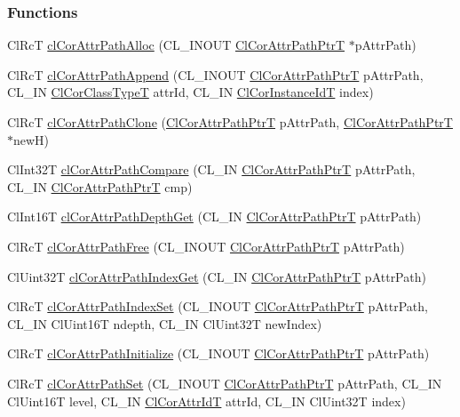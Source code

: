 \subsubsection*{Functions}
\begin{CompactItemize}
\item 
Cl\-Rc\-T \hyperlink{group__group13_ga130}{cl\-Cor\-Attr\-Path\-Alloc} (CL\_\-INOUT \hyperlink{struct_cl_cor_attr_path}{Cl\-Cor\-Attr\-Path\-Ptr\-T} $\ast$p\-Attr\-Path)
\item 
Cl\-Rc\-T \hyperlink{group__group13_ga135}{cl\-Cor\-Attr\-Path\-Append} (CL\_\-INOUT \hyperlink{struct_cl_cor_attr_path}{Cl\-Cor\-Attr\-Path\-Ptr\-T} p\-Attr\-Path, CL\_\-IN \hyperlink{group__group13_ga2}{Cl\-Cor\-Class\-Type\-T} attr\-Id, CL\_\-IN \hyperlink{group__group13_ga4}{Cl\-Cor\-Instance\-Id\-T} index)
\item 
Cl\-Rc\-T \hyperlink{group__group13_ga142}{cl\-Cor\-Attr\-Path\-Clone} (\hyperlink{struct_cl_cor_attr_path}{Cl\-Cor\-Attr\-Path\-Ptr\-T} p\-Attr\-Path, \hyperlink{struct_cl_cor_attr_path}{Cl\-Cor\-Attr\-Path\-Ptr\-T} $\ast$new\-H)
\item 
Cl\-Int32T \hyperlink{group__group13_ga141}{cl\-Cor\-Attr\-Path\-Compare} (CL\_\-IN \hyperlink{struct_cl_cor_attr_path}{Cl\-Cor\-Attr\-Path\-Ptr\-T} p\-Attr\-Path, CL\_\-IN \hyperlink{struct_cl_cor_attr_path}{Cl\-Cor\-Attr\-Path\-Ptr\-T} cmp)
\item 
Cl\-Int16T \hyperlink{group__group13_ga136}{cl\-Cor\-Attr\-Path\-Depth\-Get} (CL\_\-IN \hyperlink{struct_cl_cor_attr_path}{Cl\-Cor\-Attr\-Path\-Ptr\-T} p\-Attr\-Path)
\item 
Cl\-Rc\-T \hyperlink{group__group13_ga132}{cl\-Cor\-Attr\-Path\-Free} (CL\_\-INOUT \hyperlink{struct_cl_cor_attr_path}{Cl\-Cor\-Attr\-Path\-Ptr\-T} p\-Attr\-Path)
\item 
Cl\-Uint32T \hyperlink{group__group13_ga139}{cl\-Cor\-Attr\-Path\-Index\-Get} (CL\_\-IN \hyperlink{struct_cl_cor_attr_path}{Cl\-Cor\-Attr\-Path\-Ptr\-T} p\-Attr\-Path)
\item 
Cl\-Rc\-T \hyperlink{group__group13_ga140}{cl\-Cor\-Attr\-Path\-Index\-Set} (CL\_\-INOUT \hyperlink{struct_cl_cor_attr_path}{Cl\-Cor\-Attr\-Path\-Ptr\-T} p\-Attr\-Path, CL\_\-IN Cl\-Uint16T ndepth, CL\_\-IN Cl\-Uint32T new\-Index)
\item 
Cl\-Rc\-T \hyperlink{group__group13_ga131}{cl\-Cor\-Attr\-Path\-Initialize} (CL\_\-INOUT \hyperlink{struct_cl_cor_attr_path}{Cl\-Cor\-Attr\-Path\-Ptr\-T} p\-Attr\-Path)
\item 
Cl\-Rc\-T \hyperlink{group__group13_ga134}{cl\-Cor\-Attr\-Path\-Set} (CL\_\-INOUT \hyperlink{struct_cl_cor_attr_path}{Cl\-Cor\-Attr\-Path\-Ptr\-T} p\-Attr\-Path, CL\_\-IN Cl\-Uint16T level, CL\_\-IN \hyperlink{group__group13_ga3}{Cl\-Cor\-Attr\-Id\-T} attr\-Id, CL\_\-IN Cl\-Uint32T index)

\end{CompactItemize}
